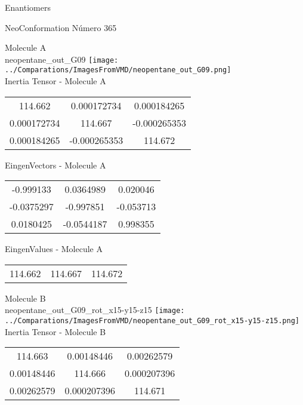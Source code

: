 \begin{center}
\vtab
\vtab
\textcolor{NavyBlue}{\Large Enantiomers}
\end{center}

 \newpage

\vtab[-2cm]
\begin{center}
{\large NeoConformation \tab Número 365}
\end{center}
\begin{multicols}{2}
\begin{center}

Molecule A \\ 
neopentane\_out\_G09
\texttt{[image: ../Comparations/ImagesFromVMD/neopentane\_out\_G09.png]}
\\
Inertia Tensor - Molecule A \\
\vtab

\begin{tabular}{|c c c|}
114.662	 & 	0.000172734	 & 	0.000184265	 \\
0.000172734	 & 	114.667	 & 	-0.000265353	 \\
0.000184265	 & 	-0.000265353	 & 	114.672
\end{tabular}

\vtab
 EingenVectors - Molecule A     \\
\vtab
\begin{tabular}{|c c c|}
-0.999133	 & 	0.0364989	 & 	0.020046	 \\
-0.0375297	 & 	-0.997851	 & 	-0.053713	 \\
0.0180425	 & 	-0.0544187	 & 	0.998355
\end{tabular}

\vtab
 EingenValues - Molecule A     \\
\vtab
\begin{tabular}{|c c c|}
114.662	 & 	114.667	 & 	114.672	 \\
\end{tabular}
\columnbreak

Molecule B \\ 
neopentane\_out\_G09\_rot\_x15-y15-z15
\texttt{[image: ../Comparations/ImagesFromVMD/neopentane\_out\_G09\_rot\_x15-y15-z15.png]}
\\
Inertia Tensor - Molecule B \\
\vtab

\begin{tabular}{|c c c|}
114.663	 & 	0.00148446	 & 	0.00262579	 \\
0.00148446	 & 	114.666	 & 	0.000207396	 \\
0.00262579	 & 	0.000207396	 & 	114.671
\end{tabular}


\end{center}
\end{multicols}
